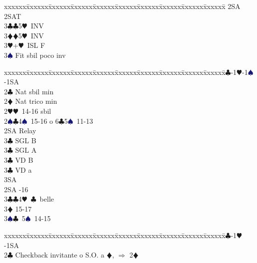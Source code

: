 \documentclass[a4paper,italian]{article}
\newcommand{\BC}{\textcolor{OliveGreen}{$\clubsuit$}}
\newcommand{\BD}{\textcolor{RedOrange}{$\vardiamondsuit$}}
\newcommand{\BH}{\textcolor{Red2}{$\varheartsuit${}}}
\newcommand{\BS}{\textcolor{MidnightBlue}{$\spadesuit${}}}
\newenvironment{bidtable}
{\begin{tabbing}

    xxxxxx\=xxxxxx\=xxxxxx\=xxxxxx\=xxxxxx\=xxxxxx\=xxxxxx\=xxxxxx\=xxxxxx\=xxxxxx\=\kill}
{\end{tabbing} }%
\begin{document}
\begin{multicols}{2}
\begin{bidtable}
                                        2SA \> 2SAT\\
                                        3\BC {}\BC 5\BH\ INV\\
                                        3\BD {}\BD 5\BH\ INV\\
                                        3\BH {}+\BH\ ISL F\\
                                        3\BS \> Fit sbil poco inv\-
                                    \end{bidtable}
                                    \vfill\null
                                    \columnbreak
                                    \begin{bidtable}
                                        1\BC-1\BH-1\BS-1SA\+\\
                                        2\BC \> Nat sbil min\\
                                        2\BD \> Nat trico min\\
                                        2\BH {}\BH\ 14-16 sbil\\
                                        2\BS {}\BC 4\BS\ 15-16 o 6\BC 5\BS\ 11-13\+\\
                                        2SA \> Relay\+\\
                                        3\BC {} SGL B\\
                                        3\BC {} SGL A\\
                                        3\BC {} VD B\\
                                        3\BC {} VD a\\
                                        3SA \-\-\\
                                        2SA -16\\
                                        3\BC {}\BC 4\BH\ \BC\ belle\\
                                        3\BD {} 15-17\\
                                        3\BS {}\BC\ 5\BS\ 14-15\-
                                    \end{bidtable}
                                    \bigbreak
                                    \begin{bidtable}
                                        1\BC-1\BH-1SA\+\\
                                        2\BC \> Checkback invitante o S.O. a \BD , $\Rightarrow$ 2\BD \\

\end{bidtable}
\end{multicols}
\end{document}
